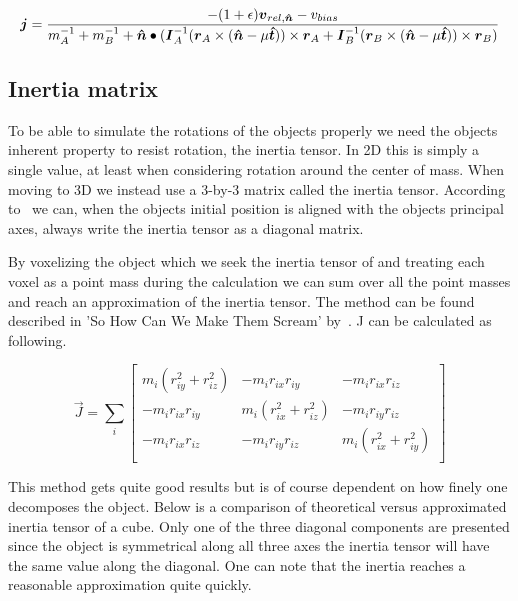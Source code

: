 \begin{equation}\label{eq:finalJ}
  \boldsymbol{j} = \frac{-(1+\epsilon)\boldsymbol{v}_{rel,\boldsymbol{\hat{n}}}-v_{bias}}
  {m_A^{-1}+m_B^{-1}+\boldsymbol{\hat{n}}\bullet(\boldsymbol{I}_A^{-1}(\boldsymbol{r}_A\times(\boldsymbol{\hat{n}}-\mu\boldsymbol{\hat{t}}))\times\boldsymbol{r}_A
  +\boldsymbol{I}_B^{-1}(\boldsymbol{r}_B\times(\boldsymbol{\hat{n}}-\mu\boldsymbol{\hat{t}}))\times\boldsymbol{r}_B)}
\end{equation}

\subsection{Inertia matrix}
To be able to simulate the rotations of the objects properly we need the objects
inherent property to resist rotation, the inertia tensor.
In 2D this is simply a single value, at least when considering rotation around
the center of mass. When moving to 3D we instead use a 3-by-3 matrix called the
inertia tensor. According to~\cite{ragnemalmscream} we can, when the objects initial
position is aligned with the objects principal axes, always write the inertia tensor
as a diagonal matrix.

By voxelizing the object which we seek the inertia tensor of and treating each voxel
as a point mass during the calculation we can sum over all the point masses and reach
an approximation of the inertia tensor. The method can be found described in
 'So How Can We Make Them Scream' by~\cite{ragnemalmscream}.
J can be calculated as following.

 \begin{equation}
  \vec{J} = \sum_i
  \begin{bmatrix}
    m_i(r_{iy}^2 + r_{iz}^2) & -m_ir_{ix}r_{iy} & -m_ir_{ix}r_{iz} \\
    -m_ir_{ix}r_{iy} & m_i(r_{ix}^2 + r_{iz}^2) & -m_ir_{iy}r_{iz} \\
    -m_ir_{ix}r_{iz} & -m_ir_{iy}r_{iz} & m_i(r_{ix}^2 + r_{iy}^2) \\
  \end{bmatrix}
 \end{equation}

 This method gets quite
 good results but is of course dependent on how finely one decomposes the object.
 Below is a comparison of theoretical versus approximated inertia tensor of a cube.
 Only one of the three diagonal components are presented since the object is symmetrical
 along all three axes the inertia tensor will have the same value along the diagonal.
 One can note that the inertia reaches a reasonable approximation quite quickly.


